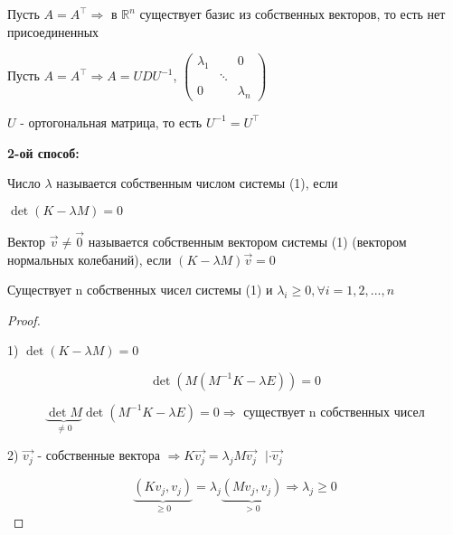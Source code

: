 \documentclass[12pt, a4paper]{report}
\begin{document}
\begin{proposition}[из алгебры]
    Пусть \( A = A^{\top} \Rightarrow   \) в \( \mathbb{R} ^n  \)  существует базис из собственных векторов, то есть нет присоединенных 
\end{proposition}

\begin{proposition}[из алгебры]
    Пусть \( A = A^{\top} \Rightarrow A = U D U^{-1}  \), \( \begin{pmatrix}
    \lambda_1 &  & 0\\
    &\ddots  & \\
    0& & \lambda_n
    \end{pmatrix} \) 

\( U  \) - ортогональная  матрица, то есть \( U ^{-1} = U^{\top }   \)  
    
\end{proposition}

\textbf{2-ой способ:}

\begin{definition}
    Число \( \lambda     \)  называется собственным числом системы (1), если
    
    \( \det (K -\lambda M ) = 0 \) 
\end{definition}

\begin{definition}
    Вектор \( \vec{v }  \neq \vec{0}  \)  называется собственным вектором системы (1) (вектором нормальных колебаний), если \( (K -\lambda M ) \vec{v } = 0 \) 
\end{definition}

\begin{theorem}
    Существует n собственных чисел системы (1) и \( \lambda_{i } \geq 0 , \forall  i = 1,2,...,n \) 
\end{theorem}

\begin{proof}
\[  \]

1) \( \det (K -\lambda M )  = 0 \) 

\[ \det (M(M^{-1} K - \lambda E )) = 0 \] 

\[ \underbrace{\det M}_{ \neq 0} \det (M^{-1 } K - \lambda E ) = 0 \Rightarrow \text{ существует n собственных чисел}  \] 

2) \( \vec{v_j}  \)  - собственные вектора \( \Rightarrow K \vec{v_j} = \lambda_j M \vec{v_j} \text{ } | \cdot \vec{v_j}   \)  

\[ \underbrace{(K v_{j }  , v_j)}_{\geq 0}  = \lambda_j \underbrace{(M v_j ,v_j)}_{>0} \Rightarrow \lambda_j \geq 0  \] 
\end{proof}
\end{document}
